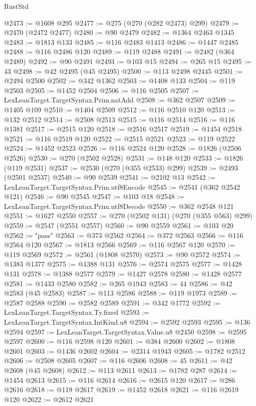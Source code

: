 \begin{lexlean}{RustStd}
\begin{coremodule}
@2473 := @1608 @295
@2477 := @275 (@270 (@282 @2473) @299)
@2479 := @2470 (@2472 @2477)
@2480 := @90 @2479
@2482 := @1364 @2463 @1345
@2483 := @1813 @133
@2485 := @116 @2483 @1413
@2486 := @1447 @2485
@2488 := @116 @2486 @120
@2489 := @119 @2488
@2491 := @2482 (@364 @2489)
@2492 := @90 @2491
@2493 := @103 @15
@2494 := @265 @15
@2495 := 43
@2498 := @42 @2495 (@45 @2495)
@2500 := @113 @2498 @2445
@2501 := @2494 @2500
@2502 := @342 @1362
@2503 := @1408 @133
@2504 := @119 @2503
@2505 := @1452 @2504
@2506 := @116 @2505
@2507 := LexLeanTarget.TargetSyntax.Prim.natAdd
@2508 := @362 @2507
@2509 := @1405 @109
@2510 := @1404 @2509
@2512 := @116 @2510 @120
@2513 := @132 @2512
@2514 := @2508 @2513
@2515 := @116 @2514
@2516 := @116 @1381
@2517 := @2515 @120
@2518 := @2516 @2517
@2519 := @1454 @2518
@2521 := @116 @2519 @120
@2522 := @2515 @2521
@2523 := @119 @2522
@2524 := @1452 @2523
@2526 := @116 @2524 @120
@2528 := @1826 (@2506 @2526)
@2530 := @270 (@2502 @2528)
@2531 := @148 @120
@2533 := @1826 (@119 @2531)
@2537 := @2530 (@270 (@355 @2533) @299)
@2539 := @2493 (@2501 @2537)
@2540 := @90 @2539
@2541 := @2102 @13
@2542 := LexLeanTarget.TargetSyntax.Prim.utf8Encode
@2545 := @2541 (@362 @2542 @121)
@2546 := @90 @2545
@2547 := @103 @18
@2548 := LexLeanTarget.TargetSyntax.Prim.utf8Decode
@2550 := @362 @2548 @121
@2551 := @1627 @2550
@2557 := @270 (@2502 @131) (@270 (@355 @563) @299)
@2559 := @2547 (@2551 @2557)
@2560 := @90 @2559
@2561 := @103 @20
@2562 := "pass"
@2563 := @373 @2562
@2564 := @372 @2563
@2566 := @116 @2564 @120
@2567 := @1813 @2566
@2569 := @116 @2567 @120
@2570 := @119 @2569
@2572 := @2561 (@1808 @2570)
@2573 := @90 @2572
@2574 := @1383 @1377
@2575 := @1388 @131
@2576 := @2574 @2575
@2577 := @1428 @131
@2578 := @1388 @2577
@2579 := @1427 @2578
@2580 := @1428 @2577
@2581 := @1433 @2580
@2582 := @265 @1943
@2583 := 44
@2586 := @42 @2583 (@45 @2583)
@2587 := @113 @2586
@2588 := @119 @1973
@2589 := @2587 @2588
@2590 := @2582 @2589
@2591 := @342 @1772
@2592 := LexLeanTarget.TargetSyntax.Ty.fixed
@2593 := LexLeanTarget.TargetSyntax.IntKind.u8
@2594 := @2592 @2593
@2595 := @136 @2594
@2597 := LexLeanTarget.TargetSyntax.Value.u8 @2450
@2598 := @2595 @2597
@2600 := @116 @2598 @120
@2601 := @384 @2600
@2602 := @1808 @2601
@2603 := @1436 @2602
@2604 := @2314 @1943
@2605 := @1782 @2512
@2606 := @2508 @2605
@2607 := @116 @2606
@2608 := 45
@2611 := @42 @2608 (@45 @2608)
@2612 := @113 @2611
@2613 := @1782 @287
@2614 := @1454 @2613
@2615 := @116 @2614
@2616 := @2615 @120
@2617 := @286 @2616
@2618 := @119 @2617
@2619 := @1452 @2618
@2621 := @116 @2619 @120
@2622 := @2612 @2621

\end{coremodule}
\end{lexlean}
